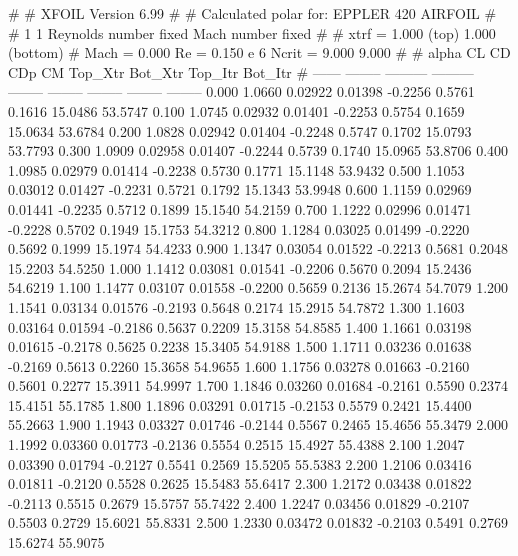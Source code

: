 #  
#       XFOIL         Version 6.99
#  
# Calculated polar for: EPPLER 420 AIRFOIL                              
#  
# 1 1 Reynolds number fixed          Mach number fixed         
#  
# xtrf =   1.000 (top)        1.000 (bottom)  
# Mach =   0.000     Re =     0.150 e 6     Ncrit =   9.000  9.000
#  
#   alpha    CL        CD       CDp       CM     Top_Xtr  Bot_Xtr  Top_Itr  Bot_Itr
#  ------ -------- --------- --------- -------- -------- -------- -------- --------
   0.000   1.0660   0.02922   0.01398  -0.2256   0.5761   0.1616  15.0486  53.5747
   0.100   1.0745   0.02932   0.01401  -0.2253   0.5754   0.1659  15.0634  53.6784
   0.200   1.0828   0.02942   0.01404  -0.2248   0.5747   0.1702  15.0793  53.7793
   0.300   1.0909   0.02958   0.01407  -0.2244   0.5739   0.1740  15.0965  53.8706
   0.400   1.0985   0.02979   0.01414  -0.2238   0.5730   0.1771  15.1148  53.9432
   0.500   1.1053   0.03012   0.01427  -0.2231   0.5721   0.1792  15.1343  53.9948
   0.600   1.1159   0.02969   0.01441  -0.2235   0.5712   0.1899  15.1540  54.2159
   0.700   1.1222   0.02996   0.01471  -0.2228   0.5702   0.1949  15.1753  54.3212
   0.800   1.1284   0.03025   0.01499  -0.2220   0.5692   0.1999  15.1974  54.4233
   0.900   1.1347   0.03054   0.01522  -0.2213   0.5681   0.2048  15.2203  54.5250
   1.000   1.1412   0.03081   0.01541  -0.2206   0.5670   0.2094  15.2436  54.6219
   1.100   1.1477   0.03107   0.01558  -0.2200   0.5659   0.2136  15.2674  54.7079
   1.200   1.1541   0.03134   0.01576  -0.2193   0.5648   0.2174  15.2915  54.7872
   1.300   1.1603   0.03164   0.01594  -0.2186   0.5637   0.2209  15.3158  54.8585
   1.400   1.1661   0.03198   0.01615  -0.2178   0.5625   0.2238  15.3405  54.9188
   1.500   1.1711   0.03236   0.01638  -0.2169   0.5613   0.2260  15.3658  54.9655
   1.600   1.1756   0.03278   0.01663  -0.2160   0.5601   0.2277  15.3911  54.9997
   1.700   1.1846   0.03260   0.01684  -0.2161   0.5590   0.2374  15.4151  55.1785
   1.800   1.1896   0.03291   0.01715  -0.2153   0.5579   0.2421  15.4400  55.2663
   1.900   1.1943   0.03327   0.01746  -0.2144   0.5567   0.2465  15.4656  55.3479
   2.000   1.1992   0.03360   0.01773  -0.2136   0.5554   0.2515  15.4927  55.4388
   2.100   1.2047   0.03390   0.01794  -0.2127   0.5541   0.2569  15.5205  55.5383
   2.200   1.2106   0.03416   0.01811  -0.2120   0.5528   0.2625  15.5483  55.6417
   2.300   1.2172   0.03438   0.01822  -0.2113   0.5515   0.2679  15.5757  55.7422
   2.400   1.2247   0.03456   0.01829  -0.2107   0.5503   0.2729  15.6021  55.8331
   2.500   1.2330   0.03472   0.01832  -0.2103   0.5491   0.2769  15.6274  55.9075

